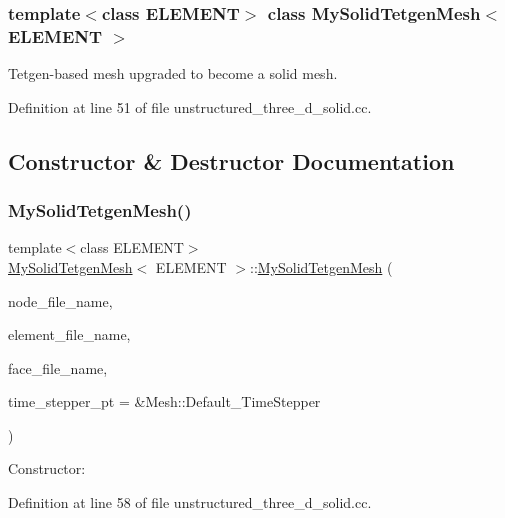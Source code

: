 \subsubsection*{template$<$class E\+L\+E\+M\+E\+NT$>$\newline
class My\+Solid\+Tetgen\+Mesh$<$ E\+L\+E\+M\+E\+N\+T $>$}

Tetgen-\/based mesh upgraded to become a solid mesh. 

Definition at line 51 of file unstructured\+\_\+three\+\_\+d\+\_\+solid.\+cc.



\subsection{Constructor \& Destructor Documentation}
\mbox{\label{classMySolidTetgenMesh_ac6f8d5bf403bb9da0149184c30eb6d8d}} 
\subsubsection{\texorpdfstring{My\+Solid\+Tetgen\+Mesh()}{MySolidTetgenMesh()}}
{\footnotesize\ttfamily template$<$class E\+L\+E\+M\+E\+NT$>$ \\
\hyperlink{classMySolidTetgenMesh}{My\+Solid\+Tetgen\+Mesh}$<$ E\+L\+E\+M\+E\+NT $>$\+::\hyperlink{classMySolidTetgenMesh}{My\+Solid\+Tetgen\+Mesh} (\begin{DoxyParamCaption}\item[{const std\+::string \&}]{node\+\_\+file\+\_\+name,  }\item[{const std\+::string \&}]{element\+\_\+file\+\_\+name,  }\item[{const std\+::string \&}]{face\+\_\+file\+\_\+name,  }\item[{Time\+Stepper $\ast$}]{time\+\_\+stepper\+\_\+pt = {\ttfamily \&Mesh\+:\+:Default\+\_\+TimeStepper} }\end{DoxyParamCaption})\hspace{0.3cm}{\ttfamily [inline]}}



Constructor\+: 



Definition at line 58 of file unstructured\+\_\+three\+\_\+d\+\_\+solid.\+cc.

